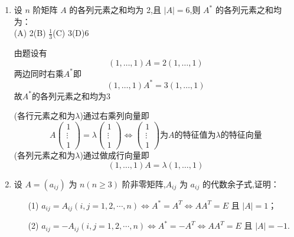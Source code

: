 \documentclass[12pt, a4paper, oneside, UTF8]{ctexbook}
\begin{document}
\begin{enumerate}[label=\arabic*.,start=9]
    \item 设 $ n $ 阶矩阵 $ A $ 的各列元素之和均为 2,且 $ |A| = 6 $,则 $ A^* $ 的各列元素之和均为：\\
    (A) 2\qquad (B) $\frac{1}{3}$\qquad (C) 3\qquad (D)6
    
    \begin{solution}
    由题设有
    $$
    \left(1,\ldots,1\right)A = 2(1,\ldots, 1)
    $$
    两边同时右乘$A^*$即
    $$
    (1,\ldots,1)A^*=3(1,\ldots,1)
    $$
    故$A^{*}$的各列元素之和均为3
    \end{solution}
    \begin{tcolorbox}[title=各行/列元素之和]
        (各行元素之和为$\lambda$)通过右乘列向量即
        $$
        A\begin{pmatrix}
            1 \\
            \vdots \\
            1
        \end{pmatrix} = \lambda \begin{pmatrix}
            1 \\
            \vdots \\
            1
        \end{pmatrix} \iff \begin{pmatrix}
            1 \\
            \vdots \\
            1
        \end{pmatrix} \text{为}A\text{的特征值为}\lambda\text{的特征向量}
        $$ 
        (各列元素之和为$\lambda$)通过做成行向量即
        $$
        \left(1,\ldots,1\right)A=\lambda\left(1,\ldots,1\right)
        $$
    \end{tcolorbox}
    \item 设 $ A = (a_{ij}) $ 为 $ n(n \geq 3) $ 阶非零矩阵,$ A_{ij} $ 为 $ a_{ij} $ 的代数余子式,证明：
    \begin{enumerate}
        \item[(1)] $ a_{ij} = A_{ij}(i, j = 1, 2, \cdots, n) \Leftrightarrow A^* = A^T \Leftrightarrow AA^T = E $ 且 $ |A| = 1 $；
        \item[(2)] $ a_{ij} = -A_{ij}(i, j = 1, 2, \cdots, n) \Leftrightarrow A^* = -A^T \Leftrightarrow AA^T = E $ 且 $ |A| = -1 $.
    \end{enumerate}
    

\end{enumerate}
\end{document}
